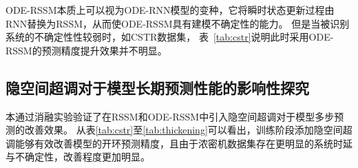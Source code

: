 ODE-RSSM本质上可以视为ODE-RNN模型的变种，它将瞬时状态更新过程由RNN替换为RSSM，从而使ODE-RSSM具有建模不确定性的能力。
但是当被识别系统的不确定性性较弱时，如CSTR数据集， 表~\ref{tab:cstr}说明此时采用ODE-RSSM的预测精度提升效果并不明显。


\subsection{隐空间超调对于模型长期预测性能的影响性探究}
本通过消融实验验证了在RSSM和ODE-RSSM中引入隐空间超调对于模型多步预测的改善效果。
从表\ref{tab:cstr}至\ref{tab:thickening}可以看出，训练阶段添加隐空间超调能够有效改善模型的开环预测精度，且由于浓密机数据集存在更明显的系统时延与不确定性，改善程度更加明显。

